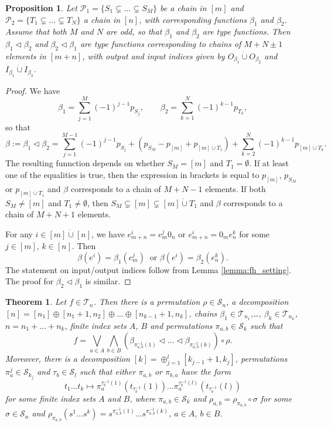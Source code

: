 \documentclass[12pt]{article}
\newtheorem{theorem}{Theorem}
\newtheorem{prop}{Proposition}
\theoremstyle{definition}
\theoremstyle{remark}
\def\Te{\mathcal T}
\def\Pe{\mathcal P}
\def\permut{\mathscr{S}}
\def\vtl{\vartriangleleft}
\begin{document}
\begin{prop}\label{prop:append_chains} Let $\Pe_1=\{S_1\subsetneq \dots\subsetneq S_M\}$ be a chain in  $[m]$ and
$\Pe_2=\{T_1\subsetneq \dots \subsetneq T_N\}$ a chain in $[n]$, 
 with corresponding functions $\beta_1$ and $\beta_2$. Assume that both $M$ and $N$ are
 odd, so that $\beta_1$ and $\beta_2$ are type functions. Then 
$\beta_1\vtl \beta_2$ and $\beta_2\vtl \beta_1$ are  type functions corresponding to
chains of $M+N\pm 1$
elements in $[m+n]$, with output and input indices given by
$O_{\beta_1}\dot{\cup}O_{\beta_2}$ and 
$I_{\beta_1}\dot{\cup} I_{\beta_2}$.

\end{prop}

\begin{proof} We have
\[
\beta_1=\sum_{j=1}^M(-1)^{j-1}p_{S_j},\qquad \beta_2=\sum_{k=1}^N(-1)^{k-1}p_{T_k},
\]
so that
\[
\beta:=\beta_1\vtl\beta_2=\sum_{j=1}^{M-1}(-1)^{j-1}p_{S_j}+(p_{S_M}-p_{[m]}+p_{[m]\dot{\cup}
T_1})+\sum_{k=2}^N(-1)^{k-1}p_{[m]\dot{\cup} T_k}.
\]
The resulting funnction depends on whether  $S_M=[m]$ and $T_1=\emptyset$. If at least one
of the equalities is true, then the expression in brackets is equal to $p_{[m]}$,
$p_{S_M}$ or $p_{[m]\dot{\cup} T_1}$  and $\beta$ corresponds to
a chain of $M+N-1$ elements. If both $S_M\ne [m]$ and $T_1\ne \emptyset$, then
$S_M\subsetneq [m]\subsetneq [m]\dot{\cup} T_1$ and $\beta$ corresponds to a chain of
$M+N+1$ elements.

For any $i\in [m]\dot{\cup} [n]$, we have  $e^i_{m+n}=e^j_m0_n$ or $e^i_{m+n}=0_me^k_n$
for some $j\in [m]$, $k\in [n]$. Then   
\[
\beta(e^i)=\beta_1(e^j_m)\ \text{ or } \beta(e^i)=\beta_2(e^k_n).
\]
The statement on input/output indices  follow from Lemma \ref{lemma:fh_setting}. The proof
for $\beta_2\vtl\beta_1$ is similar. 

\end{proof}

\begin{theorem}\label{thm:structure}
Let  $f\in \Te_n$. Then there is a prrmutation $\rho\in \permut_n$, a decomposition
$[n]=[n_1]\oplus[n_1+1,n_2]\oplus\dots\oplus [n_{k-1}+1,n_k]$, chains 
$\beta_1\in \Te_{n_1}$,\dots, $\beta_k\in
\Te_{n_k}$, $n=n_1+\dots+n_k$, finite index sets $A$, $B$ and permutations $\pi_{a,b}\in
\permut_k$ such that 
\[
f=\bigvee_{a\in A}\bigwedge_{b\in B} (\beta_{\pi^{-1}_{a,b}(1)}\vtl \dots \vtl
\beta_{\pi^{-1}_{a,b}(k)})\circ \rho.
\]
Moreover, there is a decomposition $[k]=\oplus_{j=1}^{l} [k_{j-1}+1,k_j]$, permutations $\pi_a^j\in
\permut_{k_j}$ and $\tau_b\in \permut_l$ such that either $\pi_{a,b}$ or $\pi_{b,a}$
have the form
\[
t_1\dots t_k \mapsto \pi_a^{\tau_b^{-1}(1)}(t_{\tau_b^{-1}}(1))\dots
\pi_a^{\tau_b^{-1}(l)}(t_{\tau_b^{-1}}(l))
\]
for some finite index sets $A$ and $B$, where $\pi_{a,b}\in \permut_k$ and $\rho_{a,b}=\rho_{\pi_{a,b}}\circ \sigma$ for some $\sigma\in\permut_n$ and 
$\rho_{\pi_{a,b}}(s^1\dots
s^k)=s^{\pi^{-1}_{a,b}(1)}\dots s^{\pi^{-1}_{a,b}(k)}$, $a\in A$, $b\in B$.
\end{theorem}
\end{document}
